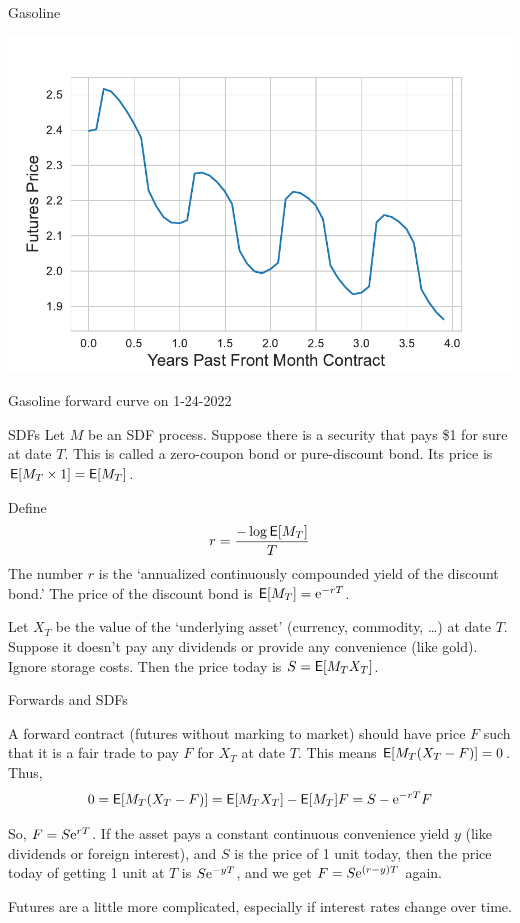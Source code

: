 \documentclass[xcolor=dvipsnames,10pt]{beamer}
\begin{document}
\begin{frame}{Gasoline}
    \begin{center}
        \includegraphics[scale=0.6]{Images/fig_rbob.pdf}
    \end{center}
    Gasoline
    forward curve on 1-24-2022
\end{frame}

\begin{frame}{SDFs}
    Let $M$ be an SDF process.  Suppose there is a security that pays \$1 for sure at date $T$.  This is called a zero-coupon bond or pure-discount bond.  Its price is 
    $\mathsf{E} [M_T \times 1] = \mathsf{E}[M_T]$.
    
    Define 
    $$r = \frac{-\log \mathsf{E}[M_T]}{T}$$
    The number $r$ is the `annualized continuously compounded yield of the discount bond.'  The price of the discount bond is $\mathsf{E}[M_T] = \mathrm{e}^{-rT}$.
    
    Let $X_T$ be the value of the `underlying asset' (currency, commodity, \ldots) at date $T$.  Suppose it doesn't pay any dividends or provide any convenience (like gold).  Ignore storage costs.  Then the price today is $S =\mathsf{E}[M_TX_T]$.
\end{frame}

\begin{frame}{Forwards and SDFs}

    A forward contract (futures without marking to market) should have price $F$ such that it is a fair trade to pay $F$ for $X_T$ at date $T$.  This means $\mathsf{E}[M_T(X_T-F)] = 0$.  Thus,
    $$0 = \mathsf{E}[M_T(X_T-F)] = \mathsf{E}[M_TX_T] -\mathsf{E}[M_T]F = S - \mathrm{e}^{-rT}F$$
    
    So, $F = S\mathrm{e}^{rT}$.  If the asset pays a constant continuous convenience yield $y$ (like dividends or foreign interest), and $S$ is the price of 1 unit today, then the price today of getting 1 unit at $T$ is $S\mathrm{e}^{-yT}$, and we get $F = S\mathrm{e}^{(r-y)T}$ again.
    
    Futures are a little more complicated, especially if interest rates change over time.
    
    
\end{frame}
\end{document}
